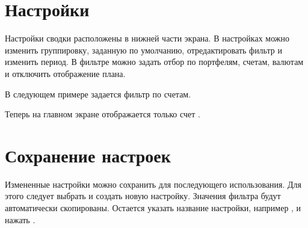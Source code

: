 \documentclass[a4paper,10pt,russian]{sphinxmanual}
\begin{document}
\noindent{}

\noindent{}


\section{Настройки}
\label{\detokenize{main-screen:id4}}
\sphinxAtStartPar
Настройки сводки расположены в нижней части экрана. В настройках можно изменить группировку, заданную по умолчанию,
отредактировать фильтр и изменить период. В фильтре можно задать отбор по портфелям, счетам, валютам и отключить
отображение плана.

\sphinxAtStartPar
В следующем примере задается фильтр по счетам.

\noindent{}

\noindent{}

\noindent{}

\noindent{}

\noindent{}

\noindent{}

\sphinxAtStartPar
Теперь на главном экране отображается только счет .


\section{Сохранение настроек}
\label{\detokenize{main-screen:id5}}
\sphinxAtStartPar
Измененные настройки можно сохранить для последующего использования. Для этого следует выбрать
 и создать новую настройку. Значения фильтра будут автоматически
скопированы. Остается указать название настройки, например , и
нажать .

\noindent{}
\end{document}
